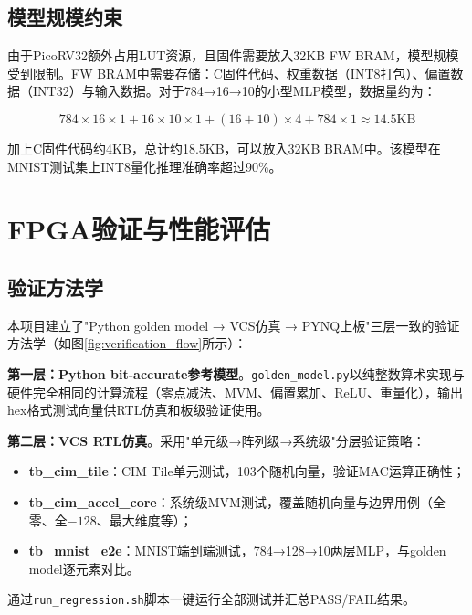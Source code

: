 \documentclass[12pt, a4paper]{article}
\begin{document}
\subsection{模型规模约束}

由于PicoRV32额外占用LUT资源，且固件需要放入32KB FW BRAM，模型规模受到限制。FW BRAM中需要存储：C固件代码、权重数据（INT8打包）、偏置数据（INT32）与输入数据。对于784→16→10的小型MLP模型，数据量约为：

\begin{equation}
	784 \times 16 \times 1 + 16 \times 10 \times 1 + (16 + 10) \times 4 + 784 \times 1 \approx 14.5\text{KB}
\end{equation}

加上C固件代码约4KB，总计约18.5KB，可以放入32KB BRAM中。该模型在MNIST测试集上INT8量化推理准确率超过90\%。

\section{FPGA验证与性能评估}

\subsection{验证方法学}

本项目建立了"Python golden model → VCS仿真 → PYNQ上板"三层一致的验证方法学（如图\ref{fig:verification_flow}所示）：

\textbf{第一层：Python bit-accurate参考模型}。\texttt{golden\_model.py}以纯整数算术实现与硬件完全相同的计算流程（零点减法、MVM、偏置累加、ReLU、重量化），输出hex格式测试向量供RTL仿真和板级验证使用。

\textbf{第二层：VCS RTL仿真}。采用"单元级→阵列级→系统级"分层验证策略：
\begin{itemize}
	\item \textbf{tb\_cim\_tile}：CIM Tile单元测试，103个随机向量，验证MAC运算正确性；
	\item \textbf{tb\_cim\_accel\_core}：系统级MVM测试，覆盖随机向量与边界用例（全零、全$-128$、最大维度等）；
	\item \textbf{tb\_mnist\_e2e}：MNIST端到端测试，784→128→10两层MLP，与golden model逐元素对比。
\end{itemize}

通过\texttt{run\_regression.sh}脚本一键运行全部测试并汇总PASS/FAIL结果。
\end{document}
